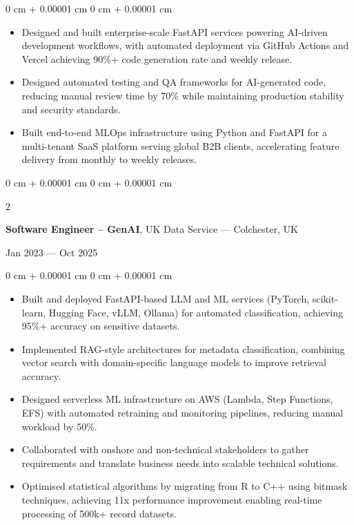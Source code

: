 \documentclass[6pt, letterpaper]{article}
\newenvironment{highlights}{
    \begin{itemize}[
        topsep=0.03 cm,
        parsep=0.03 cm,
        partopsep=0pt,
        itemsep=0pt,
        leftmargin=0 cm + 10pt
    ]
}{
    \end{itemize}
} %
\newenvironment{onecolentry}{
    \begin{adjustwidth}{
        0 cm + 0.00001 cm
    }{
        0 cm + 0.00001 cm
    }
}{
    \end{adjustwidth}
} %
\newenvironment{twocolentry}[2][]{
    \onecolentry
    \def\secondColumn{#2}
    \setcolumnwidth{\fill, 4.5 cm}
    \begin{paracol}{2}
}{
    \switchcolumn \raggedleft \secondColumn
    \end{paracol}
    \endonecolentry
} %
\begin{document}
        \begin{onecolentry}
        \begin{highlights}
            \item Designed and built enterprise-scale FastAPI services powering AI-driven development workflows, with automated deployment via GitHub Actions and Vercel achieving 90\%+ code generation rate and weekly release.
            \item Designed automated testing and QA frameworks for AI-generated code, reducing manual review time by 70\% while maintaining production stability and security standards.
            \item Built end-to-end MLOps infrastructure using Python and FastAPI for a multi-tenant SaaS platform serving global B2B clients, accelerating feature delivery from monthly to weekly releases.
        \end{highlights}
        \end{onecolentry}

        \begin{twocolentry}{Jan 2023 --- Oct 2025}
        \textbf{Software Engineer – GenAI}, UK Data Service --- Colchester, UK
        \end{twocolentry}

        \begin{onecolentry}
        \begin{highlights}

            \item Built and deployed FastAPI-based LLM and ML services (PyTorch, scikit-learn, Hugging Face, vLLM, Ollama) for automated classification, achieving 95\%+ accuracy on sensitive datasets.
            \item Implemented RAG-style architectures for metadata classification, combining vector search with domain-specific language models to improve retrieval accuracy.
            \item Designed serverless ML infrastructure on AWS (Lambda, Step Functions, EFS) with automated retraining and monitoring pipelines, reducing manual workload by 50\%.
            \item Collaborated with onshore and non-technical stakeholders to gather requirements and translate business needs into scalable technical solutions.
            \item Optimised statistical algorithms by migrating from R to C++ using bitmask techniques, achieving 11x performance improvement enabling real-time processing of 500k+ record datasets.
        \end{highlights}
        \end{onecolentry}
\end{document}
